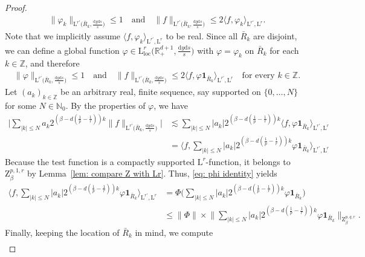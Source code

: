 \documentclass[10pt,a4paper]{amsart}
\newcommand{\IN}{\mathbb{N}}
\newcommand{\IR}{\mathbb{R}}
\newcommand{\IZ}{\mathbb{Z}}
\renewcommand{\L}{\mathrm{L}}
\newcommand{\Z}{\mathrm{Z}}
\renewcommand{\d}{\mathrm{d}}
\newcommand{\ind}{{\mathbf{1}}}
\newcommand{\loc}{\mathrm{loc}}
\begin{document}
\begin{proof}
    \begin{align*}
        \|\varphi_k\|_{\L^{r'}\big(\bar R_k, \frac{\d y \d s}{s}\big)} \leq 1 \quad \text{and} \quad  \|f\|_{\L^{r'}\big(\bar R_k, \frac{\d y \d s}{s}\big)} \leq 2 \langle f , \varphi_k\rangle_{\L^{r'},\L^{r}}.
    \end{align*}
    Note that we implicitly assume $\langle f , \varphi_k\rangle_{\L^{r'},\L^{r}}$ to be real.
    Since all $\bar R_k$ are disjoint, we can define a global function $\varphi\in \L^{r}_{\loc}\big(\IR^{d+1}_+, \frac{\d y \d s}{s}\big)$ with $\varphi = \varphi_k$ on $\bar R_k$ for each $k\in \IZ$, and therefore
    \begin{align*}
        \|\varphi\|_{\L^{r'}\big(\bar R_k, \frac{\d y \d s}{s}\big)} \leq 1 \quad \text{and} \quad  \|f\|_{\L^{r'}\big(\bar R_k, \frac{\d y \d s}{s}\big)} \leq 2 \langle f , \varphi \ind_{\bar R_k} \rangle_{\L^{r'},\L^{r}} \quad \text{for every $k\in\IZ$.}
    \end{align*}
    Let $(a_k)_{k\in\IZ}$ be an arbitrary real, finite sequence, say supported on $\{ 0, \dots, N \}$ for some $N\in\IN_0$. By the properties of $\varphi$, we have
    \begin{align}
    \label{eq: back to}
        \Big|\sum\limits_{|k|\leq N} a_k2^{(\beta-d(\frac{1}{p}-\frac{1}{r}))k} \|f\|_{\L^{r'}\big(\bar R_k, \frac{\d y \d s}{s}\big)}\big| &\lesssim  \sum\limits_{|k|\leq N} |a_k| 2^{(\beta-d(\frac{1}{p}-\frac{1}{r}))k} \langle f , \varphi \ind_{\bar R_k} \rangle_{\L^{r'},\L^r}\nonumber \\
        &=\langle f , \sum\limits_{|k|\leq N} |a_k| 2^{(\beta-d(\frac{1}{p}-\frac{1}{r}))k}\varphi \ind_{\bar R_k} \rangle_{\L^{r'},\L^r}
    \end{align}
    Because the test function is a compactly supported $\L^{r}$-function, it belongs to $\Z^{p,1,r}_\beta$ by Lemma~\ref{lem: compare Z with Lr}. Thus, \eqref{eq: phi identity} yields
    \begin{align*}
        \langle f , \sum\limits_{|k|\leq N} |a_k|2^{(\beta-d(\frac{1}{p}-\frac{1}{r}))k}\varphi \ind_{\bar R_k} \rangle_{\L^{r'},\L^r} &= \Phi\Big(\sum\limits_{|k|\leq N} |a_k|2^{(\beta-d(\frac{1}{p}-\frac{1}{r}))k}\varphi \ind_{\bar R_k} \Big)\\
        &\leq \|\Phi\|\times \bigg\|\sum\limits_{|k|\leq N} |a_k|2^{(\beta-d(\frac{1}{p}-\frac{1}{r}))k}\varphi \ind_{\bar R_k} \bigg\|_{\Z^{p,q,r}_\beta}.
    \end{align*}
    Finally, keeping the location of $\bar R_k$ in mind, we compute
    \begin{align*}

\end{align*}
\end{proof}
\end{document}
